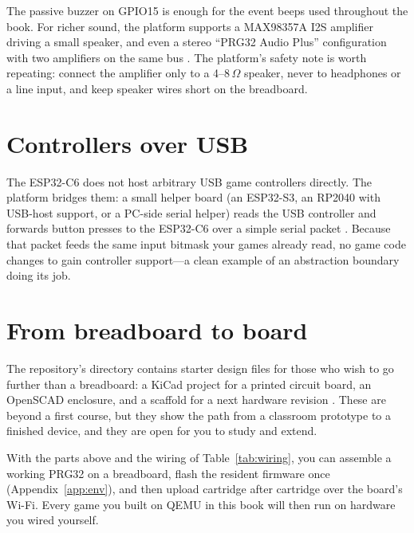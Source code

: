 The passive buzzer on GPIO15 is enough for the event beeps used throughout the
book. For richer sound, the platform supports a MAX98357A I2S amplifier driving a
small speaker, and even a stereo ``PRG32 Audio Plus'' configuration with two
amplifiers on the same bus \citep{prg32hardware}. The platform's safety note is
worth repeating: connect the amplifier only to a 4--8\,$\Omega$ speaker, never to
headphones or a line input, and keep speaker wires short on the breadboard.

\section{Controllers over USB}

The ESP32\nobreakdash-C6 does not host arbitrary USB game controllers directly. The platform
bridges them: a small helper board (an ESP32\nobreakdash-S3, an RP2040 with USB-host support,
or a PC-side serial helper) reads the USB controller and forwards button presses
to the ESP32\nobreakdash-C6 over a simple serial packet \citep{prg32repo}. Because that packet
feeds the same input bitmask your games already read, no game code changes to gain
controller support---a clean example of an abstraction boundary doing its job.

\section{From breadboard to board}

The repository's  directory contains starter design files for those
who wish to go further than a breadboard: a KiCad project for a printed circuit
board, an OpenSCAD enclosure, and a scaffold for a next hardware revision
\citep{prg32repo}. These are beyond a first course, but they show the path from a
classroom prototype to a finished device, and they are open for you to study and
extend.

\begin{prgcheck}
With the parts above and the wiring of Table~\ref{tab:wiring}, you can assemble a
working PRG32 on a breadboard, flash the resident firmware once
(Appendix~\ref{app:env}), and then upload cartridge after cartridge over the
board's Wi-Fi. Every game you built on QEMU in this book will then run on hardware
you wired yourself.
\end{prgcheck}
